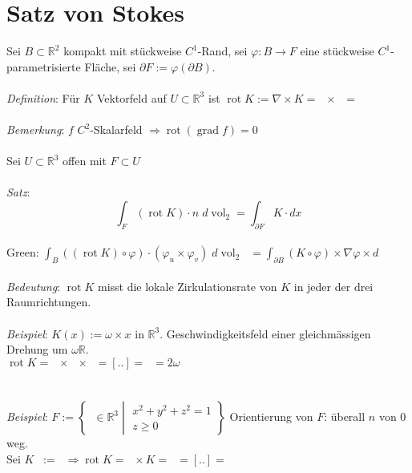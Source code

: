 \documentclass[12pt,a4paper,titlepage]{article}
\renewcommand{\d}{\partial}
\newcommand{\setR}{\mathbb{R}}
\newcommand{\vol}{\operatorname{vol}}
\newcommand{\rot}{\operatorname{rot}}
\newcommand{\twovec}[2]{\mathop{\left(\substack{#1 \\ #2}\right)}}
\newcommand{\threevec}[3]{\mathop{\left(\substack{#1 \\ #2 \\ #3}\right)}}
\begin{document}
\section*{Satz von Stokes}
Sei $B\subset\setR^2$ kompakt mit stückweise $C^1$-Rand, sei $\varphi:B\to F$ eine stückweise $C^1$-parametrisierte Fläche, sei $\d F:=\varphi(\d B)$. \\
\\
\textit{Definition}: Für $K$ Vektorfeld auf $U\subset\setR^3$ ist $\rot K:=\nabla\times K = \threevec{\d/\d x_1}{\d/\d x_2}{\d/\d x_3}\times\threevec{K_1}{K_2}{K_3}=\threevec{\frac{\d K_3}{\d x_2}-\frac{\d K_2}{\d x_3}}{\frac{\d K_1}{\d x_3}-\frac{\d K_3}{\d x_1}}{\frac{\d K_2}{\d x_1}-\frac{\d K_1}{\d x_2}}$ \\
\\
\textit{Bemerkung}: $f$ $C^2$-Skalarfeld $\Rightarrow\rot(\operatorname{grad} f)=0$ \\
\\
Sei $U\subset\setR^3$ offen mit $F\subset U$ \\
\\
\textit{Satz}: $$\int_F(\rot K)\cdot n \;d\vol_2 = \int_{\d F}K\cdot dx$$ \\
Green: $\int_B((\rot K)\circ\varphi)\cdot(\varphi_u\times\varphi_v)\;d\vol_2\twovec{u}{v}=\int_{\d B}(K\circ\varphi)\times\nabla\varphi\times d\twovec{u}{v}$ \\
\\
\textit{Bedeutung}: $\rot K$ misst die lokale Zirkulationsrate von $K$ in jeder der drei Raumrichtungen. \\
\\
\textit{Beispiel}: $K(x):=\omega\times x$ in $\setR^3$. Geschwindigkeitsfeld einer gleichmässigen Drehung um $\omega\setR$. \\
$\rot K=\threevec{\d_1}{\d_2}{\d_3}\times\threevec{\omega_1}{\omega_2}{\omega_3}\times\threevec{x_1}{x_2}{x_3} = [..] = \threevec{2\omega_1}{2\omega_2}{2\omega_3}=2\omega$ \\
\\
\\
\textit{Beispiel}: $F:=\left\{\threevec{x}{y}{z}\in\setR^3\middle|\substack{x^2+y^2+z^2=1 \\ z\geq 0}\right\}$ Orientierung von $F$: überall $n$ von 0 weg. \\
Sei $K\threevec{x}{y}{u}:=\threevec{y(z^2-x^2)}{x(y^2-z^2)}{z(x^2-y^2)} \Rightarrow \rot K=\threevec{\d_1}{\d_2}{d_3}\times K = \threevec{\d_y(z(x^2-y^2))-\d_z(x(y^2-z^2))}{..}{..}=[..]=\threevec{2z(x-y)}{2x(y-z)}{y^2+x^2-2z^2}$ \\
\end{document}
